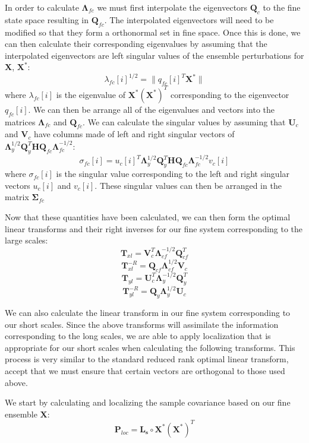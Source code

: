 \documentclass[11pt]{article} %
\newcommand{\mat}{\mathbf}
\begin{document}
In order to calculate $\mat{\Lambda}_{fc}$ we must first interpolate
the eigenvectors $\mat{Q}_c$ to the fine state space resulting in
$\mat{Q}_{fc}$.
The interpolated eigenvectors will need to be modified so that they
form a orthonormal set in fine space.
Once this is done, we can then calculate their corresponding
eigenvalues by assuming that the interpolated eigenvectors are left
singular values of the ensemble perturbations for $\mat{X}$,
$\mat{X}^*$:
\[
  \lambda_{fc}[i]^{1/2} = \lVert q_{fc}[i]^T \mat{X}^* \rVert
\]
where $\lambda_{fc}[i]$ is the eigenvalue of $\mat{X}^*\left(
  \mat{X}^* \right)^T$ corresponding to the eigenvector $q_{fc}[i]$.
We can then be arrange all of the eigenvalues and vectors into the
matrices $\mat{\Lambda}_{fc}$ and $\mat{Q}_{fc}$.
We can calculate the singular values by assuming that $\mat{U}_c$
and $\mat{V}_c$ have columns made of left and right singular vectors
of $\mat{\Lambda}_y^{1/2} \mat{Q}_y^T \mat{H} \mat{Q}_{fc}
\mat{\Lambda}_{fc}^{-1/2}$:
\[
  \sigma_{fc}[i] = u_c[i]^T \mat{\Lambda}_y^{1/2}
\mat{Q}_y^T \mat{H} \mat{Q}_{fc} \mat{\Lambda}_{fc}^{-1/2} v_{c}[i]
\]
where $\sigma_{fc}[i]$ is the singular value corresponding to the left
and right singular vectors $u_c[i]$ and $v_c[i]$.
These singular values can then be arranged in the matrix
$\mat{\Sigma}_{fc}$

Now that these quantities have been calculated, we can then form the
optimal linear transforms and their right inverses for our fine system
corresponding to the large scales:
\[
  \mat{T}_{xl} = \mat{V}_c^T \mat{\Lambda}_{cf}^{-1/2} \mat{Q}_{cf}^T
\]
\[
  \mat{T}_{xl}^{-R} = \mat{Q}_{cf} \mat{\Lambda}_{cf}^{1/2} \mat{V}_c
\]
\[
  \mat{T}_{yl} = \mat{U}_c^T \mat{\Lambda}_{y}^{-1/2} \mat{Q}_{y}^T
\]
\[
  \mat{T}_{yl}^{-R} = \mat{Q}_{y} \mat{\Lambda}_{y}^{1/2} \mat{U}_c
\]

We can also calculate the linear transform in our fine system
corresponding to our short scales.
Since the above transforms will assimilate the information
corresponding to the long scales, we are able to apply localization
that is appropriate for our short scales when calculating the
following transforms.
This process is very similar to the standard reduced rank optimal
linear transform, accept that we must ensure that certain vectors are
orthogonal to those used above.

We start by calculating and localizing the sample covariance based on
our fine ensemble $\mat{X}$:
\[
  \mat{P}_{loc} = \mat{L_s} \circ \mat{X}^* \left( \mat{X}^* \right)^T
\]
\end{document}
